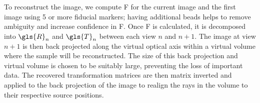 \documentclass[times, twoside, watermark]{zHenriquesLab-StyleBioRxiv}
\begin{document}
To reconstruct the image, we compute \gls{F} for the current image and the first image using 5 or more fiducial markers; having additional beads helps to remove ambiguity and increase confidence in \gls{F}.
Once \gls{F} is calculated, it is decomposed into \(\gls{R}_n\) and \(\gls{T}_n\) between each view \(n\) and \(n+1\).
The image at view \(n+1\) is then back projected along the virtual optical axis within a virtual volume where the sample will be reconstructed.
The size of this back projection and virtual volume is chosen to be suitably large, preventing the loss of important data.
The recovered transformation matrices are then matrix inverted and applied to the back projection of the image to realign the rays in the volume to their respective source positions. %
\end{document}
